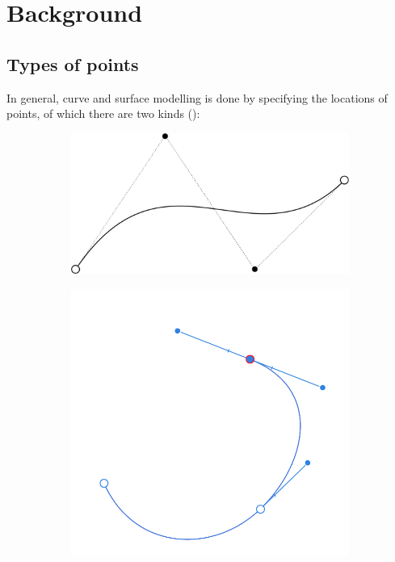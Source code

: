 \section{Background}

\subsection{Types of points}

In general, curve and surface modelling is done by specifying the locations of points, of which there are two kinds ():

\begin{figure}
\centering
\begin{subfigure}{0.5\linewidth}
\includegraphics[width=\linewidth]{figs/pointtypesa}
\caption{}%
\label{subfig:pointtypesa}
\end{subfigure}%
\begin{subfigure}{0.3\linewidth}
\includegraphics[width=\linewidth]{figs/pointtypesb}

\end{subfigure}
\end{figure}
